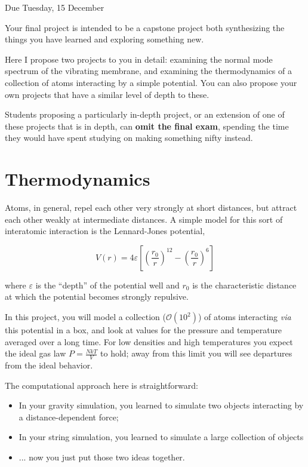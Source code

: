 \documentclass[12pt]{article}
\begin{document}
\Large
\centerline{}
\centerline{Due Tuesday, 15 December}
\normalsize

Your final project is intended to be a capstone project both synthesizing the things you have learned and exploring something new.

Here I propose two projects to you in detail: examining the normal mode spectrum of the vibrating membrane, and examining the thermodynamics of a collection of atoms interacting by a simple potential. You can also propose your own projects that have a similar 
level of depth to these.

Students proposing a particularly in-depth project, or an extension of one of these projects that is in depth, can {\bf omit the final exam}, spending the time they would have spent studying on making something nifty instead.

\section{Thermodynamics}

Atoms, in general, repel each other very strongly at short distances, but attract each other weakly at intermediate distances. A simple model for this sort of interatomic interaction is the Lennard-Jones potential,

$$
V(r) = 4\varepsilon \left[ \left(\frac{r_0}{r}\right)^{12} - \left(\frac{r_0}{r}\right)^{6} \right]
$$



where $\varepsilon$ is the ``depth'' of the potential well and $r_0$ is the characteristic distance at which the potential becomes strongly repulsive.

In this project, you will model a collection ($\mathcal O(10^2)$) of atoms interacting {\it via} this potential in a box, and look at values for the pressure and temperature averaged over a long time. For low densities and high temperatures you expect the ideal gas law $P = \frac{NkT}{V}$ to hold; 
away from this limit you will see departures from the ideal behavior. 

The computational approach here is straightforward:

\begin{itemize}
   \item{In your gravity simulation, you learned to simulate two objects interacting by a distance-dependent force;}
   \item{In your string simulation, you learned to simulate a large collection of objects}
   \item{... now you just put those two ideas together.}
\end{itemize}
\end{document}
